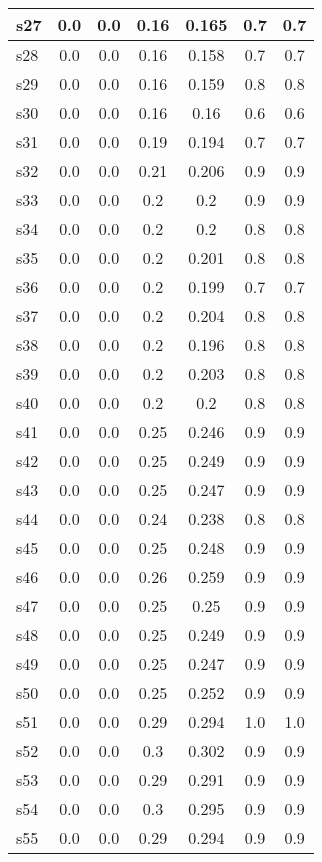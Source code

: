 \documentclass{article}
\begin{document}
\begin{tabular}{|l|c|c|c|c|c|c|}
s27 &0.0 & 0.0 & 0.16 & 0.165 & 0.7 & 0.7\\
\hline
s28 &0.0 & 0.0 & 0.16 & 0.158 & 0.7 & 0.7\\
\hline
s29 &0.0 & 0.0 & 0.16 & 0.159 & 0.8 & 0.8\\
\hline
s30 &0.0 & 0.0 & 0.16 & 0.16 & 0.6 & 0.6\\
\hline
s31 &0.0 & 0.0 & 0.19 & 0.194 & 0.7 & 0.7\\
\hline
s32 &0.0 & 0.0 & 0.21 & 0.206 & 0.9 & 0.9\\
\hline
s33 &0.0 & 0.0 & 0.2 & 0.2 & 0.9 & 0.9\\
\hline
s34 &0.0 & 0.0 & 0.2 & 0.2 & 0.8 & 0.8\\
\hline
s35 &0.0 & 0.0 & 0.2 & 0.201 & 0.8 & 0.8\\
\hline
s36 &0.0 & 0.0 & 0.2 & 0.199 & 0.7 & 0.7\\
\hline
s37 &0.0 & 0.0 & 0.2 & 0.204 & 0.8 & 0.8\\
\hline
s38 &0.0 & 0.0 & 0.2 & 0.196 & 0.8 & 0.8\\
\hline
s39 &0.0 & 0.0 & 0.2 & 0.203 & 0.8 & 0.8\\
\hline
s40 &0.0 & 0.0 & 0.2 & 0.2 & 0.8 & 0.8\\
\hline
s41 &0.0 & 0.0 & 0.25 & 0.246 & 0.9 & 0.9\\
\hline
s42 &0.0 & 0.0 & 0.25 & 0.249 & 0.9 & 0.9\\
\hline
s43 &0.0 & 0.0 & 0.25 & 0.247 & 0.9 & 0.9\\
\hline
s44 &0.0 & 0.0 & 0.24 & 0.238 & 0.8 & 0.8\\
\hline
s45 &0.0 & 0.0 & 0.25 & 0.248 & 0.9 & 0.9\\
\hline
s46 &0.0 & 0.0 & 0.26 & 0.259 & 0.9 & 0.9\\
\hline
s47 &0.0 & 0.0 & 0.25 & 0.25 & 0.9 & 0.9\\
\hline
s48 &0.0 & 0.0 & 0.25 & 0.249 & 0.9 & 0.9\\
\hline
s49 &0.0 & 0.0 & 0.25 & 0.247 & 0.9 & 0.9\\
\hline
s50 &0.0 & 0.0 & 0.25 & 0.252 & 0.9 & 0.9\\
\hline
s51 &0.0 & 0.0 & 0.29 & 0.294 & 1.0 & 1.0\\
\hline
s52 &0.0 & 0.0 & 0.3 & 0.302 & 0.9 & 0.9\\
\hline
s53 &0.0 & 0.0 & 0.29 & 0.291 & 0.9 & 0.9\\
\hline
s54 &0.0 & 0.0 & 0.3 & 0.295 & 0.9 & 0.9\\
\hline
s55 &0.0 & 0.0 & 0.29 & 0.294 & 0.9 & 0.9\\

\end{tabular}
\end{document}
